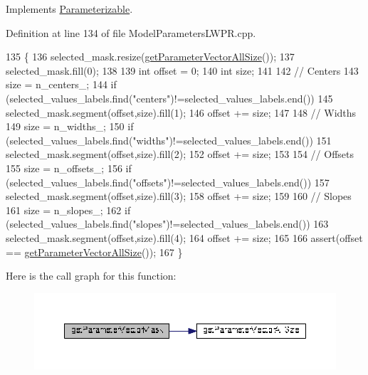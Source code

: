 Implements \hyperlink{classDmpBbo_1_1Parameterizable_ae7f6cbc5723ed4734ded5f2ba59bd366}{Parameterizable}.



Definition at line 134 of file Model\+Parameters\+L\+W\+P\+R.\+cpp.


\begin{DoxyCode}
135 \{
136   selected\_mask.resize(\hyperlink{classDmpBbo_1_1ModelParametersLWPR_ab24d2485b3b795b516f4844f225100eb}{getParameterVectorAllSize}());
137   selected\_mask.fill(0);
138   
139   \textcolor{keywordtype}{int} offset = 0;
140   \textcolor{keywordtype}{int} size;
141   
142   \textcolor{comment}{// Centers}
143   size = n\_centers\_;
144   \textcolor{keywordflow}{if} (selected\_values\_labels.find(\textcolor{stringliteral}{"centers"})!=selected\_values\_labels.end())
145     selected\_mask.segment(offset,size).fill(1);
146   offset += size;
147   
148   \textcolor{comment}{// Widths}
149   size = n\_widths\_;
150   \textcolor{keywordflow}{if} (selected\_values\_labels.find(\textcolor{stringliteral}{"widths"})!=selected\_values\_labels.end())
151     selected\_mask.segment(offset,size).fill(2);
152   offset += size;
153   
154   \textcolor{comment}{// Offsets}
155   size = n\_offsets\_;
156   \textcolor{keywordflow}{if} (selected\_values\_labels.find(\textcolor{stringliteral}{"offsets"})!=selected\_values\_labels.end())
157     selected\_mask.segment(offset,size).fill(3);
158   offset += size;
159 
160   \textcolor{comment}{// Slopes}
161   size = n\_slopes\_;
162   \textcolor{keywordflow}{if} (selected\_values\_labels.find(\textcolor{stringliteral}{"slopes"})!=selected\_values\_labels.end())
163     selected\_mask.segment(offset,size).fill(4);
164   offset += size;
165 
166   assert(offset == \hyperlink{classDmpBbo_1_1ModelParametersLWPR_ab24d2485b3b795b516f4844f225100eb}{getParameterVectorAllSize}());   
167 \}
\end{DoxyCode}


Here is the call graph for this function\+:
\nopagebreak
\begin{figure}[H]
\begin{center}
\leavevmode
\includegraphics[width=350pt]{classDmpBbo_1_1ModelParametersLWPR_a9dba1f93e426e7511630ec1ece4ace17_cgraph}
\end{center}
\end{figure}



